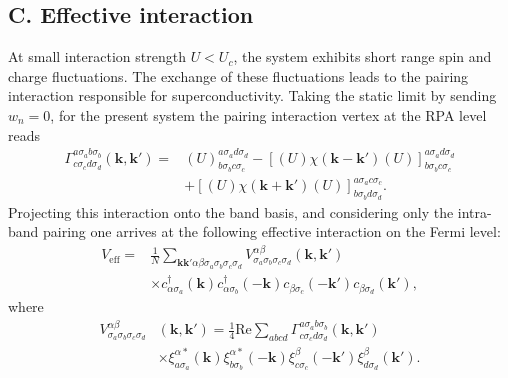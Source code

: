\documentclass[aps,prl,twocolumn,superscriptaddress,showpacs]{revtex4-1}
\begin{document}
\subsection{C. Effective interaction}
At small interaction strength $U<U_c$, the system exhibits short range spin and charge fluctuations. The exchange of these fluctuations leads to the pairing interaction responsible for superconductivity. Taking the static limit by sending $w_n=0$, for the present system the pairing interaction vertex at the RPA level reads
\begin{align}\label{gamma}
\Gamma^{a\sigma_ab\sigma_b}_{c\sigma_cd\sigma_d}
(\bm{k},\bm{k}')
=&(U)^{a\sigma_ad\sigma_d}_{b\sigma_bc\sigma_c}
-\left[(U)\chi(\bm{k}-\bm{k}')(U)\right]
^{a\sigma_ad\sigma_d}_{b\sigma_bc\sigma_c}                      \nonumber\\
&+\left[(U)\chi(\bm{k}+\bm{k}')(U)\right]
^{a\sigma_ac\sigma_c}_{b\sigma_bd\sigma_d}.
\end{align}
Projecting this interaction onto the band basis, and considering only the intra-band pairing one arrives at the following effective interaction on the Fermi level:
\begin{align}
V_\text{eff}=&\frac{1}{N}\sum_{\bm{k}\bm{k}'\alpha\beta
\sigma_a\sigma_b\sigma_c\sigma_d}
V^{\alpha\beta}_{\sigma_a\sigma_b\sigma_c\sigma_d}(\bm{k},\bm{k}')            \nonumber\\
&\times c^{\dagger}_{\alpha\sigma_a}(\bm{k})
c^{\dagger}_{\alpha\sigma_b}(-\bm{k})
c_{\beta\sigma_c}(-\bm{k}')c_{\beta\sigma_d}(\bm{k}'),
\end{align}
where
\begin{align}
V^{\alpha\beta}_{\sigma_a\sigma_b\sigma_c\sigma_d}&(\bm{k},\bm{k}')
=\frac{1}{4}\text{Re}\sum_{abcd}\Gamma^{a\sigma_ab\sigma_b}
_{c\sigma_cd\sigma_d}(\bm{k},\bm{k}')                      \nonumber\\
&\times\xi^{\alpha*}_{a\sigma_a}(\bm{k})
\xi^{\alpha*}_{b\sigma_b}(-\bm{k})
\xi^{\beta}_{c\sigma_c}(-\bm{k}')
\xi^{\beta}_{d\sigma_d}(\bm{k}').
\end{align}
\end{document}
